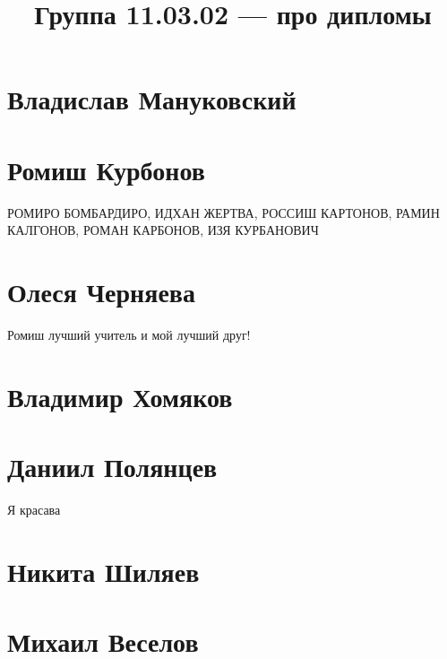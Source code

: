\documentclass{article}
\title{Группа 11.03.02 --- про дипломы}
\begin{document}
\section*{Владислав Мануковский}

\section*{Ромиш Курбонов}

РОМИРО БОМБАРДИРО, ИДХАН ЖЕРТВА, РОССИШ КАРТОНОВ, РАМИН КАЛГОНОВ, РОМАН КАРБОНОВ, ИЗЯ КУРБАНОВИЧ

\section*{Олеся Черняева}
Ромиш лучший учитель и мой лучший друг!

\section*{Владимир Хомяков}

\section*{Даниил Полянцев}
Я красава

\section*{Никита Шиляев}

\section*{Михаил Веселов}
\end{document}
